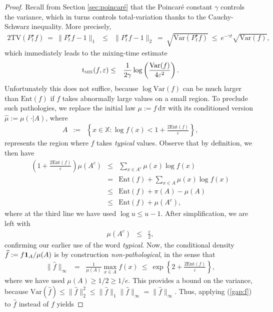 \documentclass[12pt,final]{article}
\numberwithin{equation}{section}
\newcommand{\TV}{\mathrm {TV}}
\newcommand{\Ent}{\mathrm{Ent}}
\newcommand{\Var}{\mathrm{Var}}
\newcommand{\dd}{\,\mathrm{d}}
\newcommand{\dX}{\mathbb{X}}
\newcommand{\tmix}{{\rm t}_{\textsc{mix}}}
\begin{document}
\begin{proof}
Recall from Section \ref{sec:poincaré} that the Poincaré constant $\gamma$  controls the variance, which in turns controls total-variation thanks to the Cauchy-Schwarz inequality. More precisely,
\begin{eqnarray}
\label{gap:f}
2\TV(P_t^\star f) \ = \ \|P_t^\star f-1\|_1 
& \le & \|P_t^\star f-1\|_2 \ = \ \sqrt{\Var(P_t^\star f)} \ \le \ e^{-\gamma t}\sqrt{\Var(f)},
\end{eqnarray}
which immediately leads to the mixing-time estimate
\begin{eqnarray*}
\tmix(f,\varepsilon)& \le & \frac{1}{2\gamma}\log\left(\frac{\Var(f)}{4\varepsilon^2}\right).
 \end{eqnarray*}
Unfortunately this does not suffice, because  $\log \Var(f)$ can be much larger than $\Ent(f)$ if $f$ takes abnormally large values on a small region. To preclude such pathologies, we replace the initial law $ \mu:=f\dd \pi$ with its conditioned version $\widehat{\mu}:=\mu(\cdot|A)$, where 
\begin{eqnarray*}
A & := & \left\{x\in\dX\colon \log f(x) < 1+\frac{2\Ent(f)}{\varepsilon}\right\},
\end{eqnarray*}
represents the region where $f$ takes \emph{typical} values. Observe that by definition, we then have
\begin{eqnarray*}
\left(1+\frac{2\Ent(f)}{\varepsilon}\right) \mu(A^c) & \le & \sum_{x\in A^c}\mu(x)\log f(x) \\& = & \Ent(f)+\sum_{x\in A}\mu(x)\log f(x)\\ & \le & \Ent(f)+\pi(A)-\mu(A)\\
& \le  & \Ent(f)+\mu(A^c),
\end{eqnarray*}
where at the third line we have used $\log u\le u-1$. After simplification, we are left with
\begin{eqnarray*}
\mu(A^c) & \le & \frac{\varepsilon}{2},
\end{eqnarray*}
confirming our earlier use of the word \emph{typical}. Now, the conditional density  $\widehat{f}:= f{\bf 1}_A/\mu(A)$ is by construction \emph{non-pathological}, in the sense that 
\begin{eqnarray*}
\|\widehat{f}\|_\infty& 
 = & \frac{1}{\mu(A)}\max_{x\in A}f(x) \ \le \ \exp\left\{2+\frac{2\Ent(f)}{\varepsilon}\right\},
\end{eqnarray*}
where we have used $\mu(A)\ge 1/2 \ge 1/e$. This provides a bound on the variance, because  $\Var(\widehat{f})\le \|\widehat{f}\|_2^2\le \|\widehat{f}\|_1\|\widehat{f}\|_\infty=\|\widehat{f}\|_\infty$. Thus, applying  (\ref{gap:f}) to $\widehat{f}$ instead of $f$ yields

\end{proof}
\end{document}
